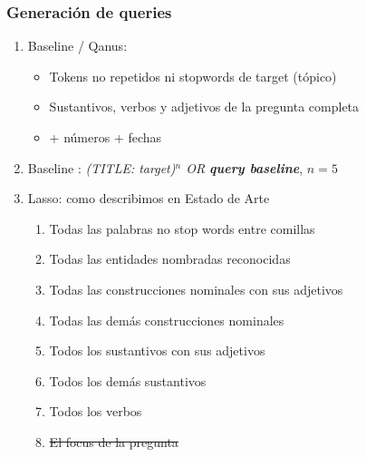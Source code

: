 \begin{frame}
\frametitle{Generación de queries}
  \begin{enumerate}
    \item Baseline / Qanus: 
    \begin{itemize}
      \item Tokens no repetidos ni stopwords de target (tópico)
      \item Sustantivos, verbos y adjetivos de la pregunta completa
      \item {\color{blue} + números + fechas}
    \end{itemize}
    \item Baseline : \textit{(TITLE: target)$^n$ OR \textbf{query baseline}},  $n=5$
    \item Lasso: como describimos en Estado de Arte
      \begin{enumerate}
        \item Todas las palabras no stop words entre comillas
        \item Todas las entidades nombradas reconocidas
        \item Todas las construcciones nominales con sus adjetivos
        \item Todas las demás construcciones nominales
        \item Todos los sustantivos con sus adjetivos
        \item Todos los demás sustantivos
        \item Todos los verbos
        \item \st{El focus de la pregunta}
        \end{enumerate}
  \end{enumerate}


\end{frame}

